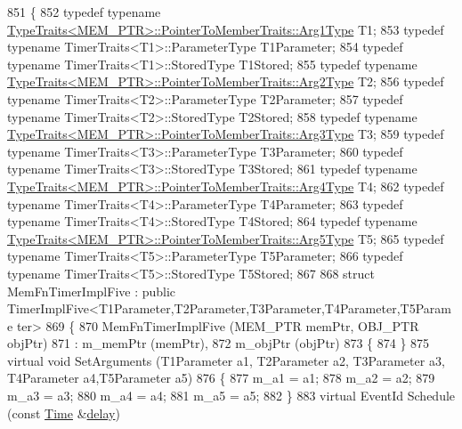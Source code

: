 \begin{DoxyCode}
851 \{
852   \textcolor{keyword}{typedef} \textcolor{keyword}{typename} \hyperlink{structTypeTraits}{TypeTraits<MEM\_PTR>::PointerToMemberTraits::Arg1Type}
       T1;
853   \textcolor{keyword}{typedef} \textcolor{keyword}{typename} TimerTraits<T1>::ParameterType T1Parameter;
854   \textcolor{keyword}{typedef} \textcolor{keyword}{typename} TimerTraits<T1>::StoredType T1Stored;
855   \textcolor{keyword}{typedef} \textcolor{keyword}{typename} \hyperlink{structTypeTraits}{TypeTraits<MEM\_PTR>::PointerToMemberTraits::Arg2Type}
       T2;
856   \textcolor{keyword}{typedef} \textcolor{keyword}{typename} TimerTraits<T2>::ParameterType T2Parameter;
857   \textcolor{keyword}{typedef} \textcolor{keyword}{typename} TimerTraits<T2>::StoredType T2Stored;
858   \textcolor{keyword}{typedef} \textcolor{keyword}{typename} \hyperlink{structTypeTraits}{TypeTraits<MEM\_PTR>::PointerToMemberTraits::Arg3Type}
       T3;
859   \textcolor{keyword}{typedef} \textcolor{keyword}{typename} TimerTraits<T3>::ParameterType T3Parameter;
860   \textcolor{keyword}{typedef} \textcolor{keyword}{typename} TimerTraits<T3>::StoredType T3Stored;
861   \textcolor{keyword}{typedef} \textcolor{keyword}{typename} \hyperlink{structTypeTraits}{TypeTraits<MEM\_PTR>::PointerToMemberTraits::Arg4Type}
       T4;
862   \textcolor{keyword}{typedef} \textcolor{keyword}{typename} TimerTraits<T4>::ParameterType T4Parameter;
863   \textcolor{keyword}{typedef} \textcolor{keyword}{typename} TimerTraits<T4>::StoredType T4Stored;
864   \textcolor{keyword}{typedef} \textcolor{keyword}{typename} \hyperlink{structTypeTraits}{TypeTraits<MEM\_PTR>::PointerToMemberTraits::Arg5Type}
       T5;
865   \textcolor{keyword}{typedef} \textcolor{keyword}{typename} TimerTraits<T5>::ParameterType T5Parameter;
866   \textcolor{keyword}{typedef} \textcolor{keyword}{typename} TimerTraits<T5>::StoredType T5Stored;
867 
868   \textcolor{keyword}{struct }MemFnTimerImplFive : \textcolor{keyword}{public} TimerImplFive<T1Parameter,T2Parameter,T3Parameter,T4Parameter,T5Parame
      ter>
869   \{
870     MemFnTimerImplFive (MEM\_PTR memPtr, OBJ\_PTR objPtr)
871       : m\_memPtr (memPtr),
872         m\_objPtr (objPtr)
873     \{
874     \}
875     \textcolor{keyword}{virtual} \textcolor{keywordtype}{void} SetArguments (T1Parameter a1, T2Parameter a2, T3Parameter a3, T4Parameter a4,T5Parameter 
      a5)
876     \{
877       m\_a1 = a1;
878       m\_a2 = a2;
879       m\_a3 = a3;
880       m\_a4 = a4;
881       m\_a5 = a5;
882     \}
883     \textcolor{keyword}{virtual} EventId Schedule (\textcolor{keyword}{const} \hyperlink{namespacens3_1_1TracedValueCallback_a7ffd3e7c142ffe7c8a1d2db9b8de38ec}{Time} &\hyperlink{lte_2model_2fading-traces_2fading__trace__generator_8m_a7964e6aa8f61a9d28973c8267a606ad8}{delay})

\end{DoxyCode}
